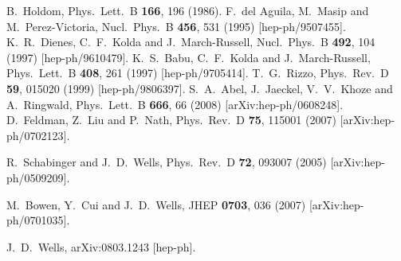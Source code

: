 \documentclass[12pt]{article}
\begin{document}
\begin{thebibliography}{9}
  B.~Holdom,
  Phys.\ Lett.\  B {\bf 166}, 196 (1986).
  F.~del Aguila, M.~Masip and M.~Perez-Victoria,
  Nucl.\ Phys.\  B {\bf 456}, 531 (1995)
  [hep-ph/9507455].
  K.~R.~Dienes, C.~F.~Kolda and J.~March-Russell,
  Nucl.\ Phys.\  B {\bf 492}, 104 (1997)
  [hep-ph/9610479].
  K.~S.~Babu, C.~F.~Kolda and J.~March-Russell,
  Phys.\ Lett.\  B {\bf 408}, 261 (1997)
  [hep-ph/9705414].
  T.~G.~Rizzo,
  Phys.\ Rev.\  D {\bf 59}, 015020 (1999)
  [hep-ph/9806397].
  S.~A.~Abel, J.~Jaeckel, V.~V.~Khoze and A.~Ringwald,
  Phys.\ Lett.\  B {\bf 666}, 66 (2008)
  [arXiv:hep-ph/0608248].
  D.~Feldman, Z.~Liu and P.~Nath,
  Phys.\ Rev.\  D {\bf 75}, 115001 (2007)
  [arXiv:hep-ph/0702123].

  R.~Schabinger and J.~D.~Wells,
  Phys.\ Rev.\  D {\bf 72}, 093007 (2005)
  [arXiv:hep-ph/0509209].
 
  M.~Bowen, Y.~Cui and J.~D.~Wells,
  JHEP {\bf 0703}, 036 (2007)
  [arXiv:hep-ph/0701035].

  
  J.~D.~Wells,
  arXiv:0803.1243 [hep-ph].




\end{thebibliography}
\end{document}
